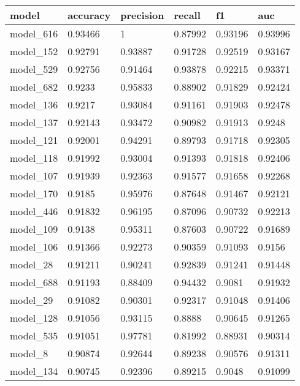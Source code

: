 \begin{tabular}{|l|l|l|l|l|l|}
\hline
\textbf{model} & \textbf{accuracy} & \textbf{precision} & \textbf{recall} & \textbf{f1} & \textbf{auc} \\ \hline
model\_616     & 0.93466           & 1                  & 0.87992         & 0.93196     & 0.93996      \\ \hline
model\_152     & 0.92791           & 0.93887            & 0.91728         & 0.92519     & 0.93167      \\ \hline
model\_529     & 0.92756           & 0.91464            & 0.93878         & 0.92215     & 0.93371      \\ \hline
model\_682     & 0.9233            & 0.95833            & 0.88902         & 0.91829     & 0.92424      \\ \hline
model\_136     & 0.9217            & 0.93084            & 0.91161         & 0.91903     & 0.92478      \\ \hline
model\_137     & 0.92143           & 0.93472            & 0.90982         & 0.91913     & 0.9248       \\ \hline
model\_121     & 0.92001           & 0.94291            & 0.89793         & 0.91718     & 0.92305      \\ \hline
model\_118     & 0.91992           & 0.93004            & 0.91393         & 0.91818     & 0.92406      \\ \hline
model\_107     & 0.91939           & 0.92363            & 0.91577         & 0.91658     & 0.92268      \\ \hline
model\_170     & 0.9185            & 0.95976            & 0.87648         & 0.91467     & 0.92121      \\ \hline
model\_446     & 0.91832           & 0.96195            & 0.87096         & 0.90732     & 0.92213      \\ \hline
model\_109     & 0.9138            & 0.95311            & 0.87603         & 0.90722     & 0.91689      \\ \hline
model\_106     & 0.91366           & 0.92273            & 0.90359         & 0.91093     & 0.9156       \\ \hline
model\_28      & 0.91211           & 0.90241            & 0.92839         & 0.91241     & 0.91448      \\ \hline
model\_688     & 0.91193           & 0.88409            & 0.94432         & 0.9081      & 0.91932      \\ \hline
model\_29      & 0.91082           & 0.90301            & 0.92317         & 0.91048     & 0.91406      \\ \hline
model\_128     & 0.91056           & 0.93115            & 0.8888          & 0.90645     & 0.91265      \\ \hline
model\_535     & 0.91051           & 0.97781            & 0.81992         & 0.88931     & 0.90314      \\ \hline
model\_8       & 0.90874           & 0.92644            & 0.89238         & 0.90576     & 0.91311      \\ \hline
model\_134     & 0.90745           & 0.92396            & 0.89215         & 0.9048      & 0.91099      \\ \hline
\end{tabular}